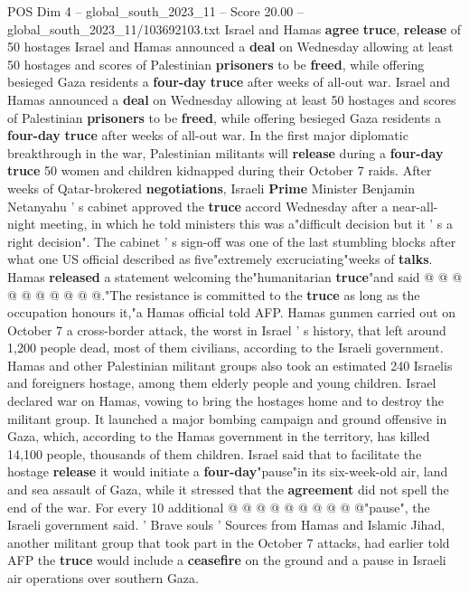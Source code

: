 \begin{textsample}{POS Dim 4 – global\_south\_2023\_11 – Score 20.00 – global\_south\_2023\_11/103692103.txt}  \label{ex:f4_pos_155}
Israel and Hamas \textbf{agree} \textbf{truce}, \textbf{release} of 50 hostages Israel and Hamas announced a \textbf{deal} on Wednesday allowing at least 50 hostages and scores of Palestinian \textbf{prisoners} to be \textbf{freed}, while offering besieged Gaza residents a \textbf{four-day} \textbf{truce} after weeks of all-out war.
Israel and Hamas announced a \textbf{deal} on Wednesday allowing at least 50 hostages and scores of Palestinian \textbf{prisoners} to be \textbf{freed}, while offering besieged Gaza residents a \textbf{four-day} \textbf{truce} after weeks of all-out war.
In the first major diplomatic breakthrough in the war, Palestinian militants will \textbf{release} during a \textbf{four-day} \textbf{truce} 50 women and children kidnapped during their October 7 raids.
After weeks of Qatar-brokered \textbf{negotiations}, Israeli \textbf{Prime} Minister Benjamin Netanyahu ' s cabinet approved the \textbf{truce} accord Wednesday after a near-all-night meeting, in which he told ministers this was a"difficult decision but it ' s a right decision".
The cabinet ' s sign-off was one of the last stumbling blocks after what one US official described as five"extremely excruciating"weeks of \textbf{talks}.
Hamas \textbf{released} a statement welcoming the"humanitarian \textbf{truce}"and said @ @ @ @ @ @ @ @ @ @."The resistance is committed to the \textbf{truce} as long as the occupation honours it,"a Hamas official told AFP.
Hamas gunmen carried out on October 7 a cross-border attack, the worst in Israel ' s history, that left around 1,200 people dead, most of them civilians, according to the Israeli government.
Hamas and other Palestinian militant groups also took an estimated 240 Israelis and foreigners hostage, among them elderly people and young children.
Israel declared war on Hamas, vowing to bring the hostages home and to destroy the militant group.
It launched a major bombing campaign and ground offensive in Gaza, which, according to the Hamas government in the territory, has killed 14,100 people, thousands of them children.
Israel said that to facilitate the hostage \textbf{release} it would initiate a \textbf{four-day}"pause"in its six-week-old air, land and sea assault of Gaza, while it stressed that the \textbf{agreement} did not spell the end of the war.
For every 10 additional @ @ @ @ @ @ @ @ @ @"pause", the Israeli government said. ' Brave souls ' Sources from Hamas and Islamic Jihad, another militant group that took part in the October 7 attacks, had earlier told AFP the \textbf{truce} would include a \textbf{ceasefire} on the ground and a pause in Israeli air operations over southern Gaza.

\end{textsample}
